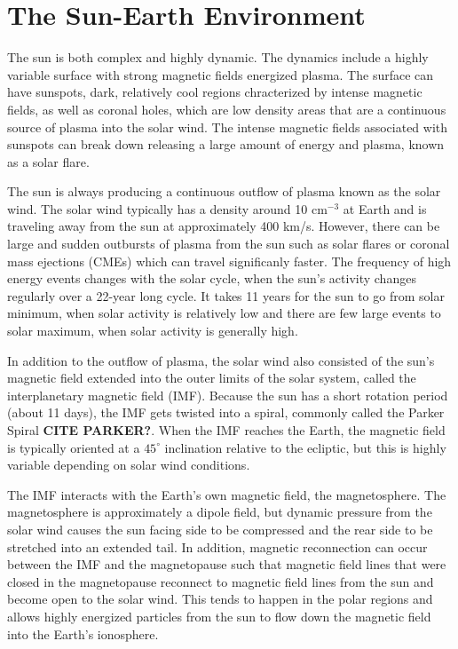 
\section{The Sun-Earth Environment}
The sun is both complex and highly dynamic.  The dynamics include a highly variable surface with strong magnetic fields energized plasma.  The surface can have sunspots, dark, relatively cool regions chracterized by intense magnetic fields, as well as coronal holes, which are low density areas that are a continuous source of plasma into the solar wind.  The intense magnetic fields associated with sunspots can break down releasing a large amount of energy and plasma, known as a solar flare.

The sun is always producing a continuous outflow of plasma known as the solar wind.  The solar wind typically has a density around 10 cm\(^{-3}\) at Earth and is traveling away from the sun at approximately 400 km/s.  However, there can be large and sudden outbursts of plasma from the sun such as solar flares or coronal mass ejections (CMEs) which can travel significanly faster.  The frequency of high energy events changes with the solar cycle, when the sun's activity changes regularly over a 22-year long cycle.  It takes 11 years for the sun to go from solar minimum, when solar activity is relatively low and there are few large events to solar maximum, when solar activity is generally high.

In addition to the outflow of plasma, the solar wind also consisted of the sun's magnetic field extended into the outer limits of the solar system, called the interplanetary magnetic field (IMF).  Because the sun has a short rotation period (about 11 days), the IMF gets twisted into a spiral, commonly called the Parker Spiral \textbf{CITE PARKER?}.  When the IMF reaches the Earth, the magnetic field is typically oriented at a \(45^\circ\) inclination relative to the ecliptic, but this is highly variable depending on solar wind conditions.

The IMF interacts with the Earth's own magnetic field, the magnetosphere.  The magnetosphere is approximately a dipole field, but dynamic pressure from the solar wind causes the sun facing side to be compressed and the rear side to be stretched into an extended tail.  In addition, magnetic reconnection can occur between the IMF and the magnetopause such that magnetic field lines that were closed in the magnetopause reconnect to magnetic field lines from the sun and become open to the solar wind.  This tends to happen in the polar regions and allows highly energized particles from the sun to flow down the magnetic field into the Earth's ionosphere.

